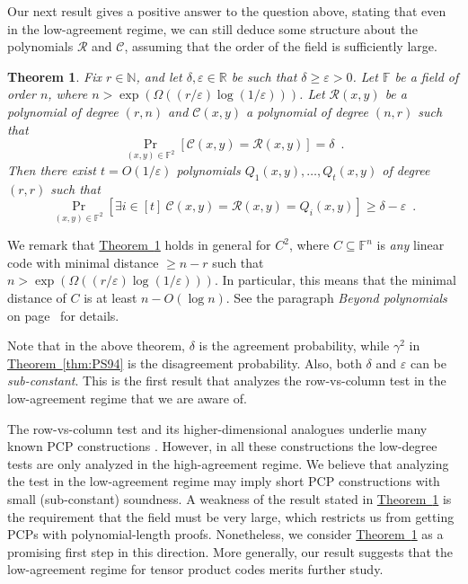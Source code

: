 \documentclass[11pt]{article}
\numberwithin{equation}{section}
\theoremstyle{definition}
\theoremstyle{plain}
\newcommand{\expref}[2]{\hyperref[#2]{#1~\ref{#2}}}
\theoremstyle{plain}
\newtheorem{ftheorem}[theorem]{Theorem}
\newcommand{\colored}{}
\newcommand{\blocklength}{\colored{n}} %
\newcommand{\Field}{\colored{\mathbb F}}
\newcommand{\degree}{\colored{r}}
\newcommand{\rowpoly}{\colored{\mathcal R}}
\newcommand{\colpoly}{\colored{\mathcal C}}
\newcommand{\prox}{\colored{\delta}}
\newcommand{\PSprox}{\colored{\gamma}}
\newcommand{\eps}{\varepsilon}
\newcommand{\Naturals}{\mathbb{N}}
\begin{document}
Our next result gives a positive answer to the question above, stating that even in the low-agreement regime, we can still deduce some structure about the polynomials $\rowpoly$ and $\colpoly$, assuming that the
%
order of the field  %
is sufficiently large.


\begin{ftheorem}
\label{thm:bivar-low-agreement}
Fix $\degree \in \Naturals$, and let $\prox, \eps \in \mathbb R$ be such that $\prox \geq \eps > 0$. Let $\Field$ be a field of
%
order  %
$\blocklength$, where $\blocklength > \exp(\Omega(({\degree}/{\eps}) \log({1}/{\eps})))$. Let $\rowpoly(x,y)$ be a polynomial of degree $(\degree,\blocklength)$ and $\colpoly(x,y)$ a polynomial of degree $(\blocklength,\degree)$ such that
\begin{equation*}
\Pr_{(x,y) \in \Field^2}[\colpoly(x,y) = \rowpoly(x,y)] = \prox \enspace.
\end{equation*}
Then there exist $t = O({1}/{\eps})$ polynomials $Q_1(x,y),\dots,Q_t(x,y)$ of degree $(\degree,\degree)$ such that
\begin{equation*}
\Pr_{(x,y) \in \Field^2}
[\exists i \in [t] \ \colpoly(x,y) = \rowpoly(x,y)= Q_i(x,y)]
\geq \prox - \eps \enspace.
\end{equation*}

\end{ftheorem}


We remark that \expref{Theorem}{thm:bivar-low-agreement} holds in general
%
%
for $C^2$, where $C \subseteq \Field^{\blocklength}$ is \emph{any} linear code      %
with minimal distance $\geq \blocklength-\degree$ such that
$\blocklength > \exp(\Omega(({\degree}/{\eps}) \log({1}/{\eps})))$.
In particular, this means that the minimal distance of $C$ is at least $\blocklength - O(\log \blocklength)$.
See the paragraph \emph{Beyond polynomials} on page~\pageref{par:beyondpoly} for details.

Note that in the above theorem, $\prox$ is the agreement probability, while $\PSprox^{2}$ in \expref{Theorem}{thm:PS94} is the disagreement probability. Also, both $\prox$ and $\eps$ can be \emph{sub-constant}. This is the first result that analyzes the row-vs-column test
%
in the low-agreement regime that we are aware of.              %

The row-vs-column test and its higher-dimensional analogues underlie many known PCP constructions \cite{BabaiFL91, BabaiFLS91, PolishchukS94, BenSassonS08}.
However, in all these constructions the
%
low-degree tests are only analyzed in the
%
high-agreement regime.   %
We believe that analyzing the test in the low-agreement regime may imply short PCP constructions with small (sub-constant) soundness.
A weakness of the result stated in \expref{Theorem}{thm:bivar-low-agreement} is the requirement that the field
%
must be very large,
which restricts us from getting PCPs with
%
polynomial-length proofs.  %
Nonetheless, we consider \expref{Theorem}{thm:bivar-low-agreement} as a promising first step in this direction.
More generally, our result suggests that the low-agreement regime for tensor product codes merits further study.
\end{document}
